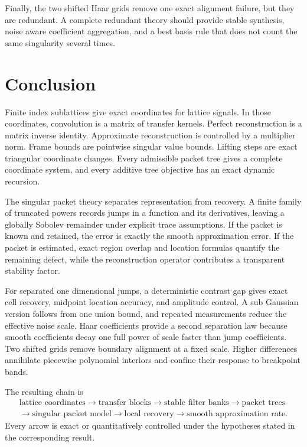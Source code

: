 \documentclass[11pt,letterpaper]{article}
\theoremstyle{plain}
\theoremstyle{plain}
\theoremstyle{plain}
\theoremstyle{definition}
\theoremstyle{definition}
\theoremstyle{definition}
\theoremstyle{definition}
\theoremstyle{remark}
\theoremstyle{remark}
\theoremstyle{remark}
\theoremstyle{remark}
\begin{document}
Finally, the two shifted Haar grids remove one exact alignment failure, but they are redundant. A complete redundant theory should provide stable synthesis, noise aware coefficient aggregation, and a best basis rule that does not count the same singularity several times.

\section{Conclusion}\label{extension:section:16}\label{sec:conclusion}

Finite index sublattices give exact coordinates for lattice signals. In those coordinates, convolution is a matrix of transfer kernels. Perfect reconstruction is a matrix inverse identity. Approximate reconstruction is controlled by a multiplier norm. Frame bounds are pointwise singular value bounds. Lifting steps are exact triangular coordinate changes. Every admissible packet tree gives a complete coordinate system, and every additive tree objective has an exact dynamic recursion.

The singular packet theory separates representation from recovery. A finite family of truncated powers records jumps in a function and its derivatives, leaving a globally Sobolev remainder under explicit trace assumptions. If the packet is known and retained, the error is exactly the smooth approximation error. If the packet is estimated, exact region overlap and location formulas quantify the remaining defect, while the reconstruction operator contributes a transparent stability factor.

For separated one dimensional jumps, a deterministic contrast gap gives exact cell recovery, midpoint location accuracy, and amplitude control. A sub Gaussian version follows from one union bound, and repeated measurements reduce the effective noise scale. Haar coefficients provide a second separation law because smooth coefficients decay one full power of scale faster than jump coefficients. Two shifted grids remove boundary alignment at a fixed scale. Higher differences annihilate piecewise polynomial interiors and confine their response to breakpoint bands.

The resulting chain is
\[
\begin{gathered}
\text{lattice coordinates}
\longrightarrow
\text{transfer blocks}
\longrightarrow
\text{stable filter banks}
\longrightarrow
\text{packet trees}
\\
\longrightarrow
\text{singular packet model}
\longrightarrow
\text{local recovery}
\longrightarrow
\text{smooth approximation rate}.
\end{gathered}
\]
Every arrow is exact or quantitatively controlled under the hypotheses stated in the corresponding result.
\end{document}
